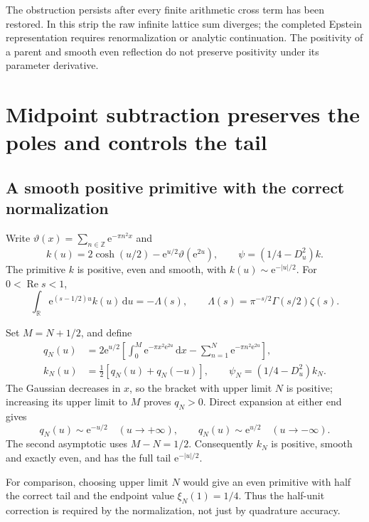 \documentclass[11pt,letterpaper]{article}
\numberwithin{equation}{section}
\theoremstyle{remark}\newtheorem{remark}[theorem]{Remark}
\newcommand{\R}{\mathbb R}
\newcommand{\dd}{\,\mathrm d}
\newcommand{\ee}{\mathrm e}
\newcommand{\Repart}{\operatorname{Re}}
\begin{document}
The obstruction persists after every finite arithmetic cross term has been restored. In this strip the raw infinite lattice sum diverges; the completed Epstein representation requires renormalization or analytic continuation. The positivity of a parent and smooth even reflection do not preserve positivity under its parameter derivative.

\section{Midpoint subtraction preserves the poles and controls the tail}
\subsection{A smooth positive primitive with the correct normalization}
Write $\vartheta(x)=\sum_{n\in\mathbb Z}\ee^{-\pi n^2x}$ and
\begin{equation}\label{eq:primitive}
k(u)=2\cosh(u/2)-\ee^{u/2}\vartheta(\ee^{2u}),
\qquad \psi=(1/4-D_u^2)k.
\end{equation}
The primitive $k$ is positive, even and smooth, with $k(u)\sim\ee^{-|u|/2}$. For $0<\Repart s<1$,
\begin{equation}
\int_{\R}\ee^{(s-1/2)u}k(u)\dd u=-\Lambda(s),
\qquad \Lambda(s)=\pi^{-s/2}\Gamma(s/2)\zeta(s).
\end{equation}

Set $M=N+1/2$, and define
\begin{align}
q_N(u)&=2\ee^{u/2}\left[
\int_0^M\ee^{-\pi x^2\ee^{2u}}\dd x
-\sum_{n=1}^N\ee^{-\pi n^2\ee^{2u}}\right],\label{eq:qmid}\\
k_N(u)&=\tfrac12[q_N(u)+q_N(-u)],\qquad
\psi_N=(1/4-D_u^2)k_N.\label{eq:kmid}
\end{align}
The Gaussian decreases in $x$, so the bracket with upper limit $N$ is positive; increasing its upper limit to $M$ proves $q_N>0$. Direct expansion at either end gives
\[
q_N(u)\sim\ee^{-u/2}\quad(u\to+\infty),\qquad
q_N(u)\sim\ee^{u/2}\quad(u\to-\infty).
\]
The second asymptotic uses $M-N=1/2$. Consequently $k_N$ is positive, smooth and exactly even, and has the full tail $\ee^{-|u|/2}$.

For comparison, choosing upper limit $N$ would give an even primitive with half the correct tail and the endpoint value $\xi_N(1)=1/4$. Thus the half-unit correction is required by the normalization, not just by quadrature accuracy.
\end{document}
